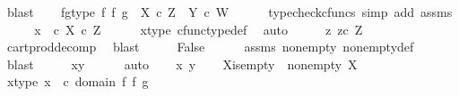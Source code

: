 \begin{isabellebody}
\ blast\isanewline
\ \ \isamarkupfalse%
\ fg{\isacharunderscore}{\kern0pt}type{\isacharcolon}{\kern0pt}\ {\isachardoublequoteopen}f\ {\isasymtimes}\isactrlsub f\ g\ {\isacharcolon}{\kern0pt}\ X\ {\isasymtimes}\isactrlsub c\ Z\ {\isasymrightarrow}\ Y\ {\isasymtimes}\isactrlsub c\ W{\isachardoublequoteclose}\isanewline
\ \ \ \ \isamarkupfalse%
\ {\isacharparenleft}{\kern0pt}typecheck{\isacharunderscore}{\kern0pt}cfuncs{\isacharcomma}{\kern0pt}\ simp\ add{\isacharcolon}{\kern0pt}\ assms{\isacharparenleft}{\kern0pt}{}{\isacharcomma}{\kern0pt}{}{\isacharparenright}{\kern0pt}{\isacharparenright}{\kern0pt}\isanewline
\ \ \isamarkupfalse%
\ \isamarkupfalse%
\ {\isachardoublequoteopen}x\ \ {\isasymin}\isactrlsub c\ X\ {\isasymtimes}\isactrlsub c\ Z{\isachardoublequoteclose}\isanewline
\ \ \ \ \isamarkupfalse%
\ x{\isacharunderscore}{\kern0pt}type\ cfunc{\isacharunderscore}{\kern0pt}type{\isacharunderscore}{\kern0pt}def\ \isamarkupfalse%
\ auto\isanewline
\ \ \isamarkupfalse%
\ \isamarkupfalse%
\ {\isachardoublequoteopen}{\isasymexists}z{\isachardot}{\kern0pt}\ z{\isasymin}\isactrlsub c\ Z{\isachardoublequoteclose}\isanewline
\ \ \ \ \isamarkupfalse%
\ cart{\isacharunderscore}{\kern0pt}prod{\isacharunderscore}{\kern0pt}decomp\ \isamarkupfalse%
\ blast\isanewline
\ \ \isamarkupfalse%
\ \isamarkupfalse%
\ False\isanewline
\ \ \ \ \isamarkupfalse%
\ assms{\isacharparenleft}{\kern0pt}{}{\isacharparenright}{\kern0pt}\ nonempty\ nonempty{\isacharunderscore}{\kern0pt}def\ \isamarkupfalse%
\ blast\isanewline
\ \ \isamarkupfalse%
\ \isamarkupfalse%
\ {\isachardoublequoteopen}x{\isacharequal}{\kern0pt}y{\isachardoublequoteclose}\isanewline
\ \ \ \ \isamarkupfalse%
\ auto\isanewline
{}\isamarkupfalse%
\isanewline
\ \ \isamarkupfalse%
\ x\ y\isanewline
\ \ \isamarkupfalse%
\ X{\isacharunderscore}{\kern0pt}is{\isacharunderscore}{\kern0pt}empty{\isacharcolon}{\kern0pt}\ {\isachardoublequoteopen}{\isasymnot}\ nonempty\ X{\isachardoublequoteclose}\isanewline
\ \ \isamarkupfalse%
\ x{\isacharunderscore}{\kern0pt}type{\isacharcolon}{\kern0pt}\ {\isachardoublequoteopen}x\ \ {\isasymin}\isactrlsub c\ domain\ {\isacharparenleft}{\kern0pt}f\ {\isasymtimes}\isactrlsub f\ g{\isacharparenright}{\kern0pt}{\isachardoublequoteclose}\isanewline

\end{isabellebody}
